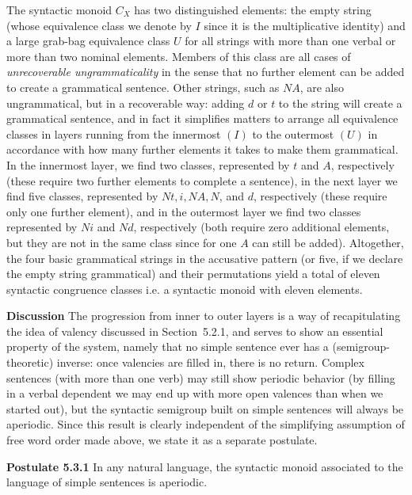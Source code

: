 The syntactic monoid $C_X$ has two distinguished elements: the empty string
(whose equivalence class we denote by $I$ since it is the multiplicative
identity) and a large grab-bag equivalence class $U$ for all strings with more
than one verbal or more than two nominal elements. Members of this class are
all cases of {\it unrecoverable ungrammaticality}
 in the sense that no further element
can be added to create a grammatical sentence. Other strings, such as $NA$,
are also ungrammatical, but in a recoverable way: adding $d$ or $t$ to the
string will create a grammatical sentence, and in fact it simplifies matters
to arrange all equivalence classes in layers running from the innermost $(I)$
to the outermost $(U)$ in accordance with how many further elements it takes
to make them grammatical. In the innermost layer, we find two classes,
represented by $t$ and $A$, respectively (these require two further elements
to complete a sentence), in the next layer we find five classes, represented
by $Nt, i, NA, N$, and $d$, respectively (these require only one further
element), and in the outermost layer we find two classes represented by $Ni$
and $Nd$, respectively (both require zero additional elements, but they are not
in the same class since for one $A$ can still be added). Altogether, the four
basic grammatical strings in the accusative pattern (or five, if we declare
the empty string grammatical) and their permutations yield a total of eleven
syntactic congruence classes i.e. a syntactic monoid with eleven elements.

\smallskip
\noindent
{\bf Discussion} The progression from inner to outer layers is a way of
recapitulating the idea of valency  discussed in Section~5.2.1, and
serves to show an essential property of the system, namely that no simple
sentence ever has a (semigroup-theoretic) inverse: once valencies are filled
in, there is no return. Complex sentences (with more than one verb) may still
show periodic behavior (by filling in a verbal dependent we may end up with
more open valences than when we started out), but the syntactic semigroup built
on simple sentences will always be aperiodic.  Since this result is clearly
independent of the simplifying assumption of free word order made above, we
state it as a separate postulate.

\medskip
\noindent
{\bf Postulate 5.3.1} In any natural language, the syntactic monoid associated
to the language of simple sentences is aperiodic. 

